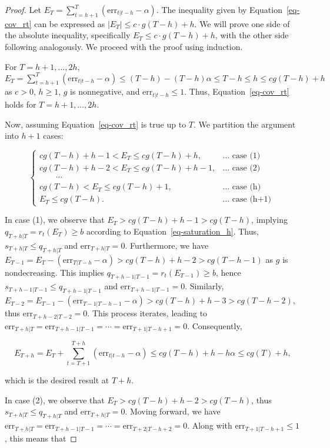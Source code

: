 \documentclass[
  11pt,
  a4paper,
]{article}
\theoremstyle{plain}
\theoremstyle{plain}
\theoremstyle{remark}
\begin{document}
\begin{proof}
Let \(E_T=\sum_{t=h+1}^{T}\left(\mathrm{err}_{t|t-h}-\alpha\right)\).
The inequality given by Equation~\ref{eq-cov_rt} can be expressed as
\(\left|E_T\right| \leq c \cdot g(T-h) + h\). We will prove one side of
the absolute inequality, specifically \(E_T \leq c \cdot g(T-h) + h\),
with the other side following analogously. We proceed with the proof
using induction.

For \(T=h+1,\ldots,2h\),
\(E_T = \sum_{t=h+1}^{T}(\mathrm{err}_{t|t-h}-\alpha) \leq (T-h)-(T-h)\alpha \leq T-h \leq h \leq cg(T-h) + h\)
as \(c>0\), \(h\geq 1\), \(g\) is nonnegative, and
\(\mathrm{err}_{t|t-h} \leq 1\). Thus, Equation~\ref{eq-cov_rt} holds
for \(T=h+1,\ldots,2h\).

Now, assuming Equation~\ref{eq-cov_rt} is true up to \(T\). We partition
the argument into \(h+1\) cases:

\[
\begin{cases}
cg(T-h)+h-1 < E_T \leq cg(T-h)+h, & \ldots \text { case (1) } \\
cg(T-h)+h-2 < E_T \leq cg(T-h)+h-1, & \ldots \text { case (2) } \\
\qquad \cdots \\
cg(T-h) < E_T \leq cg(T-h)+1, & \ldots \text { case (h) } \\
E_T \leq cg(T-h). & \ldots \text { case (h+1) }
\end{cases}
\]

In case (1), we observe that \(E_T > cg(T-h)+h-1 > cg(T-h)\), implying
\(q_{T+h|T} = r_t(E_{T}) \geq b\) according to
Equation~\ref{eq-saturation_h}. Thus, \(s_{T+h|T} \leq q_{T+h|T}\) and
\(\mathrm{err}_{T+h|T} = 0\). Furthermore, we have
\(E_{T-1} = E_T - (\mathrm{err}_{T|T-h} - \alpha) > cg(T-h)+h-2 > cg(T-h-1)\)
as \(g\) is nondecreasing. This implies
\(q_{T+h-1|T-1} = r_t(E_{T-1}) \geq b\), hence
\(s_{T+h-1|T-1} \leq q_{T+h-1|T-1}\) and
\(\mathrm{err}_{T+h-1|T-1} = 0\). Similarly,
\(E_{T-2} = E_{T-1} - (\mathrm{err}_{T-1|T-h-1} - \alpha) > cg(T-h)+h-3 > cg(T-h-2)\),
thus \(\mathrm{err}_{T+h-2|T-2} = 0\). This process iterates, leading to
\(\mathrm{err}_{T+h|T} = \mathrm{err}_{T+h-1|T-1} = \cdots = \mathrm{err}_{T+1|T-h+1} = 0\).
Consequently,

\[
E_{T+h} = E_T+\sum_{t=T+1}^{T+h}(\mathrm{err}_{t|t-h}-\alpha) \leq cg(T-h)+h-h\alpha \leq cg(T)+h,
\]

which is the desired result at \(T+h\).

In case (2), we observe that \(E_T > cg(T-h)+h-2 > cg(T-h)\), thus
\(s_{T+h|T} \leq q_{T+h|T}\) and \(\mathrm{err}_{T+h|T} = 0\). Moving
forward, we have
\(\mathrm{err}_{T+h|T} = \mathrm{err}_{T+h-1|T-1} = \cdots = \mathrm{err}_{T+2|T-h+2} = 0\).
Along with \(\mathrm{err}_{T+1|T-h+1} \leq 1\), this means that


\end{proof}
\end{document}
